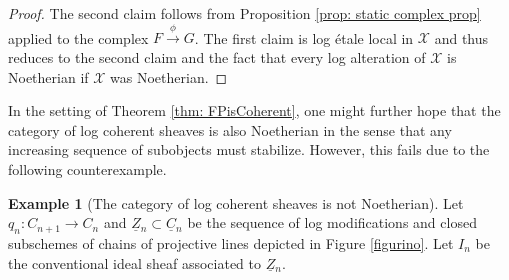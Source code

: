 \documentclass[11pt]{amsart}
\theoremstyle{definition}
\theoremstyle{definition}
\newtheorem{example}[theorem]{Example}
\newcommand{\ul}[1]{\underline{#1}}
\begin{document}
\begin{proof}
    The second claim follows from Proposition \ref{prop: static complex prop} applied to the complex $F\xrightarrow{\phi} G$. The first claim is log \'etale local in $\mathcal{X}$ and thus reduces to the second claim and the fact that every log alteration of $\mathcal{X}$ is Noetherian if $\mathcal{X}$ was Noetherian.
\end{proof}
In the setting of Theorem \ref{thm: FPisCoherent}, one might further hope that the category of log coherent sheaves is also Noetherian in the sense that any increasing sequence of subobjects must stabilize. However, this fails due to the following counterexample.

\begin{example}[The category of log coherent sheaves is not Noetherian]\label{example: not Noetherian}
Let $q_n\colon C_{n+1}\rightarrow C_n$ and $\ul{Z}{}_n\subset \ul{C}{}_n$ be the sequence of log modifications and closed subschemes of chains of projective lines depicted in Figure \ref{figurino}. Let $I_n$ be the conventional ideal sheaf associated to $\ul{Z}{}_n$.

\end{example}
\end{document}
